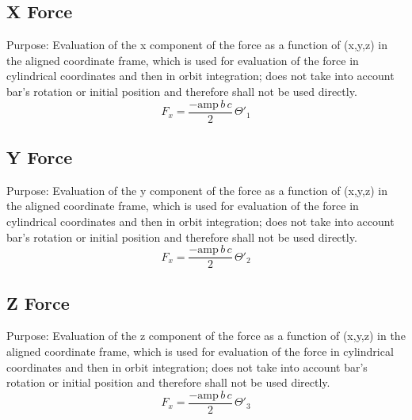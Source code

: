 \documentclass[a4paper,11pt]{article}
\begin{document}
		
		\subsection{X Force} %
			Purpose: Evaluation of the x component of the force as a function of (x,y,z) in the aligned coordinate frame, which is used for evaluation of the force in cylindrical coordinates and then in orbit integration; does not take into account bar's rotation or initial position and therefore shall not be used directly.\\
   		\begin{equation}
   		F_x = \frac{-\mathrm{amp}\,b\,c}{2}\,\Theta'_1
   		\end{equation}  
			

		\subsection{Y Force} %
			Purpose: Evaluation of the y component of the force as a function of (x,y,z) in the aligned coordinate frame, which is used for evaluation of the force in cylindrical coordinates and then in orbit integration; does not take into account bar's rotation or initial position and therefore shall not be used directly.\\
   		\begin{equation}
   		F_x = \frac{-\mathrm{amp}\,b\,c}{2}\,\Theta'_2
   		\end{equation}	
	   		
	
		
		\subsection{Z Force} %
			Purpose: Evaluation of the z component of the force as a function of (x,y,z) in the aligned coordinate frame, which is used for evaluation of the force in cylindrical coordinates and then in orbit integration; does not take into account bar's rotation or initial position and therefore shall not be used directly.\\
   		\begin{equation}
   		F_x = \frac{-\mathrm{amp}\,b\,c}{2}\,\Theta'_3
   		\end{equation}
	   			
	
		
\end{document}

